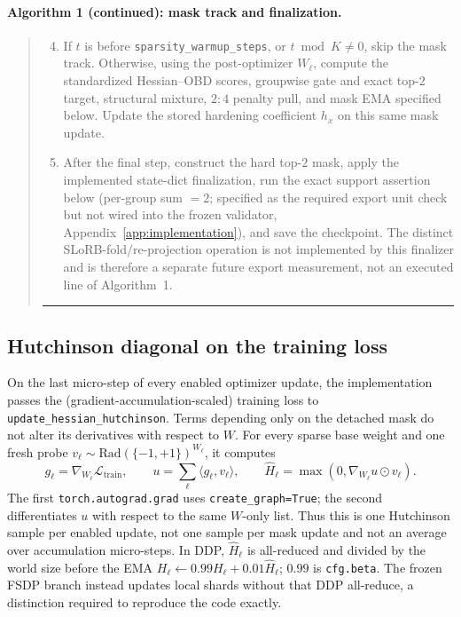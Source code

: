 \documentclass{article}
\begin{document}
\begin{minipage}{\linewidth}
\paragraph{Algorithm 1 (continued): mask track and finalization.}
\begin{quote}\small
\begin{enumerate}
  \setcounter{enumi}{3}
  \item If $t$ is before \texttt{sparsity\_warmup\_steps}, or $t\bmod K\ne0$,
  skip the mask track. Otherwise, using the post-optimizer $W_\ell$, compute
  the standardized Hessian--OBD scores, groupwise gate and exact top-$2$
  target, structural mixture, $2{:}4$ penalty pull, and mask EMA specified
  below. Update the stored hardening coefficient $h_x$ on this same mask
  update.
  \item After the final step, construct the hard top-$2$ mask, apply the
  implemented state-dict finalization, run the exact support assertion below
  (per-group sum $=2$; specified as the required export unit check but not
  wired into the frozen validator, Appendix~\ref{app:implementation}),
  and save the checkpoint. The distinct SLoRB-fold/re-projection operation is
  not implemented by this finalizer and is therefore a separate future export
  measurement, not an executed line of Algorithm~1.
\end{enumerate}
\noindent\rule{\linewidth}{0.4pt}
\end{quote}
\end{minipage}

\subsection{Hutchinson diagonal on the training loss}
On the last micro-step of every enabled optimizer update, the implementation
passes the (gradient-accumulation-scaled) training loss to
\texttt{update\_hessian\_hutchinson}. Terms depending only on the detached
mask do not alter its derivatives with respect to $W$. For every sparse base
weight and one fresh probe $v_\ell\sim\mathrm{Rad}(\{-1,+1\})^{W_\ell}$, it
computes
\begin{equation}
g_\ell=\nabla_{W_\ell}\mathcal{L}_{\mathrm{train}},\qquad
u=\sum_\ell\langle g_\ell,v_\ell\rangle,\qquad
\widehat H_\ell=\max\!\left(0,
  \nabla_{W_\ell}u\odot v_\ell\right).
\end{equation}
The first \texttt{torch.autograd.grad} uses
\texttt{create\_graph=True}; the second differentiates $u$ with respect to
the same $W$-only list. Thus this is one Hutchinson sample per enabled update,
not one sample per mask update and not an average over accumulation
micro-steps. In DDP, $\widehat H_\ell$ is all-reduced and divided by the world
size before the EMA
$H_\ell\leftarrow0.99H_\ell+0.01\widehat H_\ell$; $0.99$ is
\texttt{cfg.beta}. The frozen FSDP branch instead updates local shards without
that DDP all-reduce, a distinction required to reproduce the code exactly.
\end{document}
